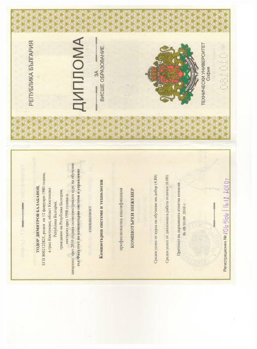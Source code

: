 \documentclass[english,a4paper]{europasscv}
\begin{document}
\includegraphics[width=\textwidth,height=\textheight,keepaspectratio]{DiplomaTU2010_1}
\end{document}
